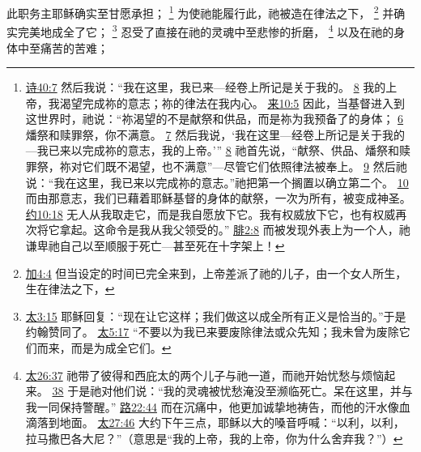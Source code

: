 \documentclass[12pt, a4paper, oneside]{ctexart}
\newcounter{parnum}[section]
\newcommand{\N}{%
   \noindent\refstepcounter{parnum}%
    \makebox[\parindent][l]{\textbf{\arabic{parnum}.}}}
\begin{document}
\N 此职务主耶稣确实至甘愿承担；
	\footnote {
		\href{https://biblehub.com/psalms/40-7.htm}{诗40:7} 然后我说：“我在这里，我已来---经卷上所记是关于我的。
		\href{https://biblehub.com/psalms/40-8.htm}{8} 我的上帝，我渴望完成祢的意志；祢的律法在我内心。
		\href{https://biblehub.com/hebrews/10-5.htm}{来10:5} 因此，当基督进入到这世界时，祂说：“祢渴望的不是献祭和供品，而是祢为我预备了的身体；
		\href{https://biblehub.com/hebrews/10-6.htm}{6} 燔祭和赎罪祭，你不满意。
		\href{https://biblehub.com/hebrews/10-7.htm}{7} 然后我说，‘我在这里---经卷上所记是关于我的---我已来以完成祢的意志，我的上帝。’”
		\href{https://biblehub.com/hebrews/10-8.htm}{8} 祂首先说，“献祭、供品、燔祭和赎罪祭，祢对它们既不渴望，也不满意”---尽管它们依照律法被奉上。
		\href{https://biblehub.com/hebrews/10-9.htm}{9} 然后祂说：“我在这里，我已来以完成祢的意志。”祂把第一个搁置以确立第二个。
		\href{https://biblehub.com/hebrews/10-10.htm}{10} 而由那意志，我们已藉着耶稣基督的身体的献祭，一次为所有，被变成神圣。
		\href{https://biblehub.com/john/10-18.htm}{约10:18} 无人从我取走它，而是我自愿放下它。我有权威放下它，也有权威再次将它拿起。这命令是我从我父领受的。”
		\href{https://biblehub.com/philippians/2-8.htm}{腓2:8} 而被发现外表上为一个人，祂谦卑祂自己以至顺服于死亡---甚至死在十字架上！
	}
	为使祂能履行此，祂被造在律法之下，
	\footnote {
		\href{https://biblehub.com/galatians/4-4.htm}{加4:4} 但当设定的时间已完全来到，上帝差派了祂的儿子，由一个女人所生，生在律法之下，
	}
	并确实完美地成全了它；
	\footnote {
		\href{https://biblehub.com/matthew/3-15.htm}{太3:15} 耶稣回复：“现在让它这样；我们做这以成全所有正义是恰当的。”于是约翰赞同了。
		\href{https://biblehub.com/matthew/5-17.htm}{太5:17} “不要以为我已来要废除律法或众先知；我未曾为废除它们而来，而是为成全它们。
	}
	忍受了直接在祂的灵魂中至悲惨的折磨，
	\footnote {
		\href{https://biblehub.com/matthew/26-37.htm}{太26:37} 祂带了彼得和西庇太的两个儿子与祂一道，而祂开始忧愁与烦恼起来。
		\href{https://biblehub.com/matthew/26-38.htm}{38} 于是祂对他们说：“我的灵魂被忧愁淹没至濒临死亡。呆在这里，并与我一同保持警醒。”
		\href{https://biblehub.com/luke/22-44.htm}{路22:44} 而在沉痛中，他更加诚挚地祷告，而他的汗水像血滴落到地面。
		\href{https://biblehub.com/matthew/27-46.htm}{太27:46} 大约下午三点，耶稣以大的嗓音呼喊：“以利，以利，拉马撒巴各大尼？”（意思是“我的上帝，我的上帝，你为什么舍弃我？”）
	}
	以及在祂的身体中至痛苦的苦难；
\end{document}
